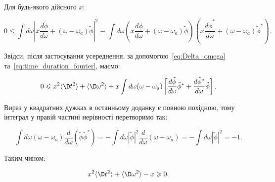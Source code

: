 Для будь-якого дійсного \( x \):

\begin{equation*}
	0 \leqslant \int d\omega \left| x \frac{d\tilde\phi}{d\omega} + (\omega - \omega_a) \tilde\phi \right|^2
	\equiv
	\int d\omega \left( x \frac{d\tilde\phi}{d\omega} + (\omega -
	\omega_a) \tilde\phi \right) \left( x \frac{d\tilde\phi^{*}}{d\omega} + (\omega - \omega_a) \tilde\phi^{*} \right).
\end{equation*}

Звідси, після застосування усереднення, за допомогою~\eqref{eq:Delta_omega} та~\eqref{eq:time_duration_fourier}, маємо:

\begin{equation*}
	0 \leqslant  x^2 \langle \D t^2 \rangle
	+
	\langle \D \omega^2 \rangle
	+
	x \int d\omega (\omega - \omega_a) \left[ \frac{d\tilde\phi}{d\omega}
		\tilde\phi^{*} + \frac{d\tilde\phi^{*}}{d\omega} \tilde\phi \right].
\end{equation*}

Вираз у квадратних дужках в останньому доданку є повною похідною, тому інтеграл у правій частині нерівності перетворимо
так:

\begin{equation*}
	\int d\omega (\omega - \omega_a) \frac{d}{d\omega} (\tilde\phi \tilde\phi^{*}) = -\int d\omega |\tilde\phi|^2 \frac{d}{d\omega} (\omega - \omega_a) = - \int d\omega \left| \tilde\phi\right|^2 =  -1.
\end{equation*}

Таким чином:

\begin{equation*}
	x^2 \langle \D t^2 \rangle + \langle \D \omega^2 \rangle - x \geqslant0.
\end{equation*}

